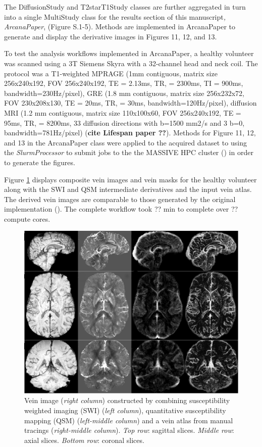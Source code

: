 The DiffusionStudy and T2starT1Study classes are further aggregated in
turn into a single MultiStudy class for the results section of this
manuscript\emph{, ArcanaPaper}, (Figure S.1-5). Methods are implemented
in ArcanaPaper to generate and display the derivative images in Figures
11, 12, and 13.

To test the analysis workflows implemented in ArcanaPaper, a healthy
volunteer was scanned using a 3T Siemens Skyra with a 32-channel head
and neck coil. The protocol was a T1-weighted MPRAGE (1mm contiguous,
matrix size 256x240x192, FOV 256x240x192, TE = 2.13ms, TR, = 2300ms, TI
= 900ms, bandwidth=230Hz/pixel), GRE (1.8 mm contiguous, matrix size
256x232x72, FOV 230x208x130, TE = 20ms, TR, = 30ms,
bandwidth=120Hz/pixel), diffusion MRI (1.2 mm contiguous, matrix size
110x100x60, FOV 256x240x192, TE = 95ms, TR, = 8200ms, 33 diffusion
directions with b=1500 mm2/s and 3 b=0, bandwidth=781Hz/pixel)
(\textbf{cite Lifespan paper ??}). Methods for Figure 11, 12, and 13 in
the ArcanaPaper class were applied to the acquired dataset to using the
\emph{SlurmProcessor} to submit jobs to the the MASSIVE HPC cluster
(\cite{goscinski_multi-modal_2014}) in order to generate the figures.

Figure \ref{fig:veins} displays composite vein images and vein masks for the healthy
volunteer along with the SWI and QSM intermediate derivatives and the
input vein atlas. The derived vein images are comparable to those
generated by the original implementation (\cite{ward_combining_2018}). The complete
workflow took ?? min to complete over ?? compute cores.


\begin{figure}
  \begin{center}
    \includegraphics[width=\textwidth]{figures/veins}
  \caption{Vein image (\emph{right column}) constructed by
combining susceptibility weighted imaging (SWI) (\emph{left column}),
quantitative susceptibility mapping (QSM) (\emph{left-middle column})
and a vein atlas from manual tracings (\emph{right-middle column}).
\emph{Top row}: sagittal slices. \emph{Middle row}: axial slices.
\emph{Bottom row}: coronal slices.}
  \end{center}
\label{fig:veins}
\end{figure}

